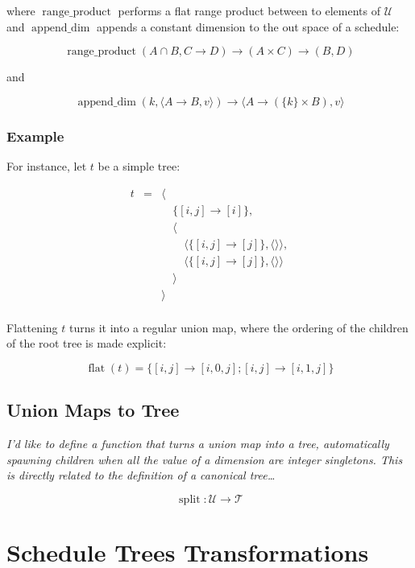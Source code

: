 \documentclass{article}
\DeclareMathOperator\flaty{flat}
\DeclareMathOperator\rangeproduct{range\_product}
\DeclareMathOperator\appenddim{append\_dim}
\DeclareMathOperator\splity{split}
\begin{document}
\noindent where $\rangeproduct$ performs a flat range product between to elements of $\mathcal{U}$ and $\appenddim$ appends a constant dimension to the out space of a schedule:

\[
    \rangeproduct(A \cap B, C \rightarrow D) \rightarrow (A \times C) \rightarrow (B, D)
\]

\noindent and

\[
    \appenddim(k, \langle A \rightarrow B, v\rangle) \rightarrow \langle A \rightarrow (\{k\} \times B), v \rangle
\]

\subsubsection*{Example}

For instance, let $t$ be a simple tree:

\[
    \begin{array}{lcl}
        t &=& \langle \\
          & & \quad\{[i,j] \rightarrow [i] \},\\
          & & \quad\langle \\
          & & \quad\quad \langle\{ [i,j] \rightarrow [j] \}, \langle\rangle\rangle,\\
          & & \quad\quad \langle\{ [i,j] \rightarrow [j] \}, \langle\rangle\rangle\\
          & & \quad\rangle \\
          & & \rangle \\
    \end{array}
\]

Flattening $t$ turns it into a regular union map, where the ordering of the children of the root tree is made explicit:

\[
    \flaty(t) = \{ [i,j] \rightarrow [i,0,j] ; [i,j] \rightarrow [i,1,j] \}
\]

\subsection{Union Maps to Tree}

{ \raggedleft\emph{I'd like to define a function that turns a union map into a
tree, automatically spawning children when all the value of a dimension are
integer singletons. This is directly related to the definition of a canonical tree\dots} }

\[
    \splity: \mathcal{U} \rightarrow \mathcal{T}
\]



\section{Schedule Trees Transformations}
\label{sec:schedule-tree-transformations}
\end{document}
